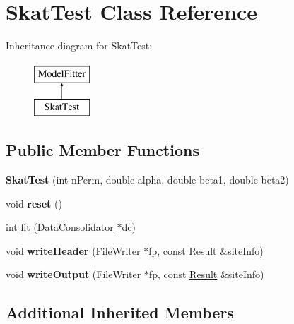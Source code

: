 \hypertarget{classSkatTest}{\section{Skat\-Test Class Reference}
\label{classSkatTest}
}
Inheritance diagram for Skat\-Test\-:\begin{figure}[H]
\begin{center}
\leavevmode
\includegraphics[height=2.000000cm]{classSkatTest}
\end{center}
\end{figure}
\subsection*{Public Member Functions}
\begin{DoxyCompactItemize}
\item 
\hypertarget{classSkatTest_af780a3f263eb12f976ec8d1528e09eba}{{\bfseries Skat\-Test} (int n\-Perm, double alpha, double beta1, double beta2)}\label{classSkatTest_af780a3f263eb12f976ec8d1528e09eba}

\item 
\hypertarget{classSkatTest_a6ce75617c1e0e4d63e6bd95415dbe431}{void {\bfseries reset} ()}\label{classSkatTest_a6ce75617c1e0e4d63e6bd95415dbe431}

\item 
int \hyperlink{classSkatTest_a7cf069d7bf19a2d6f238f14518f69ebe}{fit} (\hyperlink{classDataConsolidator}{Data\-Consolidator} $\ast$dc)
\item 
\hypertarget{classSkatTest_aaf1c103dac2289666011fd64c3b2de25}{void {\bfseries write\-Header} (File\-Writer $\ast$fp, const \hyperlink{classResult}{Result} \&site\-Info)}\label{classSkatTest_aaf1c103dac2289666011fd64c3b2de25}

\item 
\hypertarget{classSkatTest_a780ba3fded4d1bf77d00bd8f33ddf5be}{void {\bfseries write\-Output} (File\-Writer $\ast$fp, const \hyperlink{classResult}{Result} \&site\-Info)}\label{classSkatTest_a780ba3fded4d1bf77d00bd8f33ddf5be}

\end{DoxyCompactItemize}
\subsection*{Additional Inherited Members}


